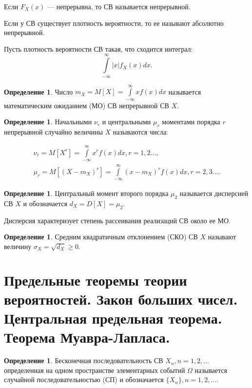 \documentclass[12pt]{report}
\theoremstyle{definition}
\newtheorem{definition}[theorem]{Определение}
\begin{document}
Если $F_X(x)$ --- непрерывна, то СВ называется непрерывной.

Если у СВ существует плотность вероятности, то ее называют абсолютно непрерывной. 

Пусть плотность вероятности СВ такая, что сходится интеграл:
$$
\int\limits_{-\infty}^{\infty} |x| f_X(x) dx.
$$

\begin{definition}
Число
$
m_X = M[X] = \int\limits_{-\infty}^{\infty} x f(x) dx
$
называется математическим ожиданием (МО) СВ непрерывной СВ $X$.
\end{definition}

\begin{definition}
Начальными $\nu_r$ и центральными $\mu_r$ моментами порядка $r$ непрерывной
случайно величины $X$ называются числа:

\begin{gather*}
\nu_r = M [X^r] =  \int\limits_{-\infty}^{\infty} x^r f(x) dx, r = 1, 2 \dots, \\
\mu_r = M[ (X - m_X)^r ] = \int\limits_{-\infty}^{\infty} (x - m_X)^r f(x) dx, r = 2, 3 \dots.
\end{gather*}
\end{definition}

\begin{definition}
Центральный момент второго порядка $\mu_2$ называется дисперсией СВ $X$ и обозначается
$d_X = D[X] = \mu_2$.

Дисперсия  характеризует степень рассеивания реализаций СВ около ее МО.
\end{definition}

\begin{definition}
Средним квадратичным отклонением (СКО) СВ $X$ называют величину $\sigma_X = \sqrt{d_X} \ge 0$.
\end{definition}



\section
{
  Предельные теоремы теории вероятностей.
  Закон больших чисел. Центральная предельная теорема.
  Теорема Муавра-Лапласа.
}

\begin{definition}
Бесконечная последовательность СВ $X_n, n = 1, 2, \dots$ определенная
на одном пространстве элементарных событий $\Omega$ называется случайной
последовательностью (СП) и обозначается $\{X_n\}, n = 1, 2, \dots$.
\end{definition}
\end{document}
